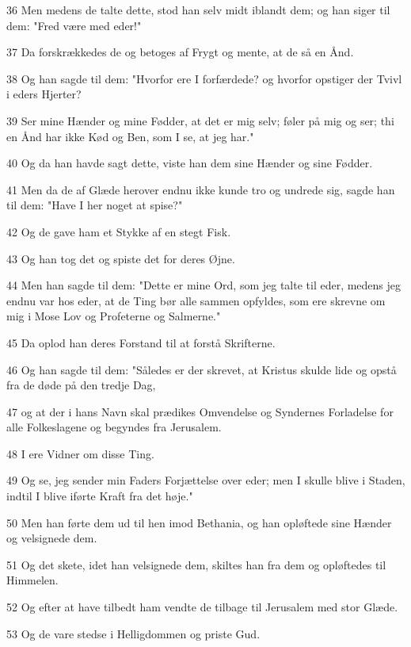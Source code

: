 \par 36 Men medens de talte dette, stod han selv midt iblandt dem; og han siger til dem: "Fred være med eder!"
\par 37 Da forskrækkedes de og betoges af Frygt og mente, at de så en Ånd.
\par 38 Og han sagde til dem: "Hvorfor ere I forfærdede? og hvorfor opstiger der Tvivl i eders Hjerter?
\par 39 Ser mine Hænder og mine Fødder, at det er mig selv; føler på mig og ser; thi en Ånd har ikke Kød og Ben, som I se, at jeg har."
\par 40 Og da han havde sagt dette, viste han dem sine Hænder og sine Fødder.
\par 41 Men da de af Glæde herover endnu ikke kunde tro og undrede sig, sagde han til dem: "Have I her noget at spise?"
\par 42 Og de gave ham et Stykke af en stegt Fisk.
\par 43 Og han tog det og spiste det for deres Øjne.
\par 44 Men han sagde til dem: "Dette er mine Ord, som jeg talte til eder, medens jeg endnu var hos eder, at de Ting bør alle sammen opfyldes, som ere skrevne om mig i Mose Lov og Profeterne og Salmerne."
\par 45 Da oplod han deres Forstand til at forstå Skrifterne.
\par 46 Og han sagde til dem: "Således er der skrevet, at Kristus skulde lide og opstå fra de døde på den tredje Dag,
\par 47 og at der i hans Navn skal prædikes Omvendelse og Syndernes Forladelse for alle Folkeslagene og begyndes fra Jerusalem.
\par 48 I ere Vidner om disse Ting.
\par 49 Og se, jeg sender min Faders Forjættelse over eder; men I skulle blive i Staden, indtil I blive iførte Kraft fra det høje."
\par 50 Men han førte dem ud til hen imod Bethania, og han opløftede sine Hænder og velsignede dem.
\par 51 Og det skete, idet han velsignede dem, skiltes han fra dem og opløftedes til Himmelen.
\par 52 Og efter at have tilbedt ham vendte de tilbage til Jerusalem med stor Glæde.
\par 53 Og de vare stedse i Helligdommen og priste Gud.



